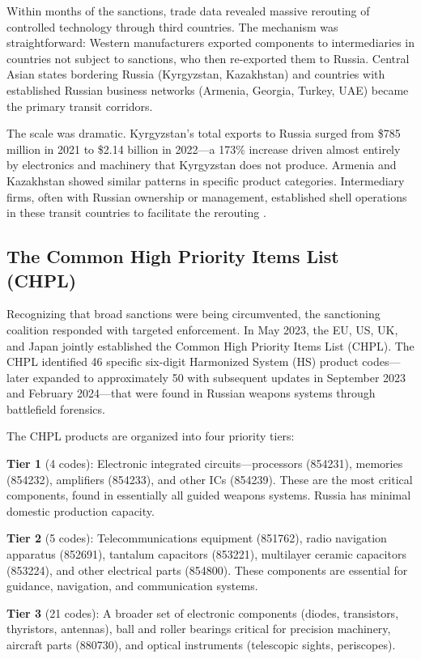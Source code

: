 \documentclass[12pt]{article}
\begin{document}
Within months of the sanctions, trade data revealed massive rerouting of controlled technology through third countries. The mechanism was straightforward: Western manufacturers exported components to intermediaries in countries not subject to sanctions, who then re-exported them to Russia. Central Asian states bordering Russia (Kyrgyzstan, Kazakhstan) and countries with established Russian business networks (Armenia, Georgia, Turkey, UAE) became the primary transit corridors.

The scale was dramatic. Kyrgyzstan's total exports to Russia surged from \$785 million in 2021 to \$2.14 billion in 2022---a 173\% increase driven almost entirely by electronics and machinery that Kyrgyzstan does not produce. Armenia and Kazakhstan showed similar patterns in specific product categories. Intermediary firms, often with Russian ownership or management, established shell operations in these transit countries to facilitate the rerouting \citep{egorov2024sanctions}.

\subsection{The Common High Priority Items List (CHPL)}

Recognizing that broad sanctions were being circumvented, the sanctioning coalition responded with targeted enforcement. In May 2023, the EU, US, UK, and Japan jointly established the Common High Priority Items List (CHPL). The CHPL identified 46 specific six-digit Harmonized System (HS) product codes---later expanded to approximately 50 with subsequent updates in September 2023 and February 2024---that were found in Russian weapons systems through battlefield forensics.

The CHPL products are organized into four priority tiers:

\textbf{Tier 1} (4 codes): Electronic integrated circuits---processors (854231), memories (854232), amplifiers (854233), and other ICs (854239). These are the most critical components, found in essentially all guided weapons systems. Russia has minimal domestic production capacity.

\textbf{Tier 2} (5 codes): Telecommunications equipment (851762), radio navigation apparatus (852691), tantalum capacitors (853221), multilayer ceramic capacitors (853224), and other electrical parts (854800). These components are essential for guidance, navigation, and communication systems.

\textbf{Tier 3} (21 codes): A broader set of electronic components (diodes, transistors, thyristors, antennas), ball and roller bearings critical for precision machinery, aircraft parts (880730), and optical instruments (telescopic sights, periscopes).
\end{document}
